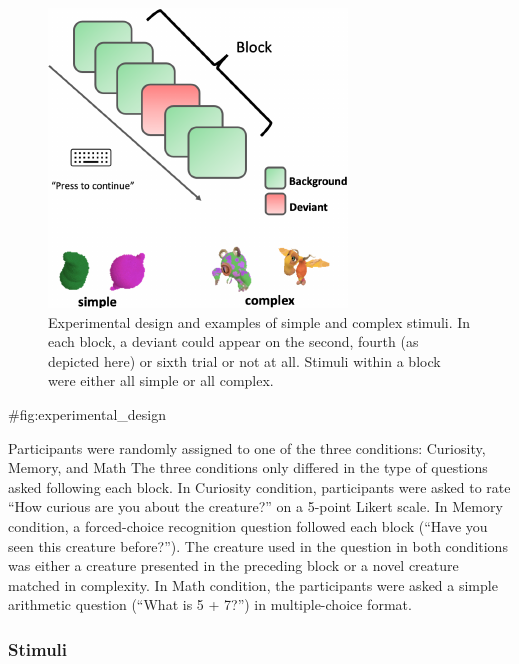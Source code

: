 \documentclass[10pt, letterpaper]{article}
\newenvironment{CodeChunk}{}{}
\begin{document}
\begin{CodeChunk}
\begin{figure}[H]

{\centering \includegraphics{figs/experimental_design-1} 

}

\caption[Experimental design and examples of simple and complex stimuli]{Experimental design and examples of simple and complex stimuli. In each block, a deviant could appear on the second, fourth (as depicted here) or sixth trial or not at all. Stimuli within a block were either all simple or all complex.}\label{fig:experimental_design}
\end{figure}
\begin{CodeOutput}
{#fig:experimental_design}
\end{CodeOutput}
\end{CodeChunk}

Participants were randomly assigned to one of the three conditions:
Curiosity, Memory, and Math The three conditions only differed in the
type of questions asked following each block. In Curiosity condition,
participants were asked to rate ``How curious are you about the
creature?'' on a 5-point Likert scale. In Memory condition, a
forced-choice recognition question followed each block (``Have you seen
this creature before?''). The creature used in the question in both
conditions was either a creature presented in the preceding block or a
novel creature matched in complexity. In Math condition, the
participants were asked a simple arithmetic question (``What is 5 +
7?'') in multiple-choice format.

\hypertarget{stimuli}{%
\subsubsection{Stimuli}\label{stimuli}}
\end{document}
